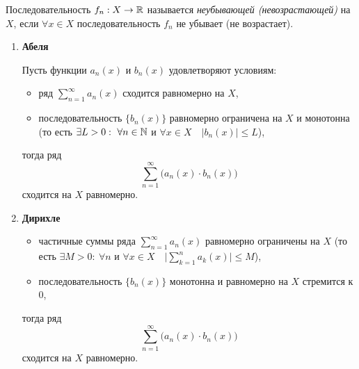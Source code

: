 \begin{definition}
    Последовательность $f_n: X \rightarrow\mathbb{R}$ называется \emph{неубывающей (невозрастающей)} на $X$, если $\forall x \in X$ последовательность $f_n$ не убывает (не возрастает).
\end{definition}

\begin{theorem}\leavevmode
    \begin{enumerate}
        \item \textbf{Абеля}

              Пусть функции $a_n(x)$ и $b_n(x)$ удовлетворяют условиям:
              \begin{itemize}
                  \item ряд $\sum_{n=1}^{\infty}a_n(x)$ сходится равномерно на $X$,
                  \item последовательность $\big\{b_n(x)\big\}$ равномерно ограничена на $X$ и монотонна (то есть $\exists L > 0: \ \forall n \in \N$ и $\forall x \in X \quad \big|b_n(x)\big| \leqslant L$),
              \end{itemize}
              тогда ряд
              \[
                  \sum_{n=1}^{\infty}\big(a_n(x) \cdot b_n(x)\big)
              \]
              сходится на $X$ равномерно.

        \item \textbf{Дирихле}

              \begin{itemize}
                  \item частичные суммы ряда $\sum_{n=1}^{\infty}a_n(x)$ равномерно ограничены на $X$ (то есть $\exists M > 0: \ \forall n$ и $\forall x \in X \quad \big|\sum_{k=1}^{n}a_k(x)\big| \leqslant M$),
                  \item последовательность $ \big\{b_n(x)\big\} $ монотонна и равномерно на $ X $ стремится к $ 0 $,
              \end{itemize}
              тогда ряд
              \[
                  \sum_{n=1}^{\infty}\big(a_n(x) \cdot b_n(x)\big)
              \]
              сходится на $X$ равномерно.
    \end{enumerate}
\end{theorem}

